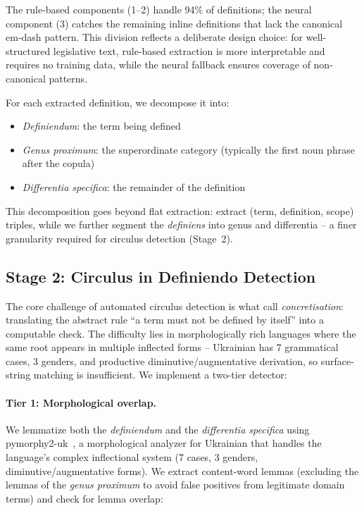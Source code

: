 \documentclass[11pt]{article}
\begin{document}
The rule-based components (1--2) handle 94\% of definitions; the neural component (3) catches the remaining inline definitions that lack the canonical em-dash pattern.
This division reflects a deliberate design choice: for well-structured legislative text, rule-based extraction is more interpretable and requires no training data, while the neural fallback ensures coverage of non-canonical patterns.

For each extracted definition, we decompose it into:
\begin{itemize}[nosep,leftmargin=*]
  \item \emph{Definiendum}: the term being defined
  \item \emph{Genus proximum}: the superordinate category (typically the first noun phrase after the copula)
  \item \emph{Differentia specifica}: the remainder of the definition
\end{itemize}

This decomposition goes beyond flat extraction: \citet{hosabettu2025statutory} extract (term, definition, scope) triples, while we further segment the \emph{definiens} into genus and differentia -- a finer granularity required for circulus detection (Stage~2).

\subsection{Stage 2: Circulus in Definiendo Detection}
\label{sec:circulus-method}

The core challenge of automated circulus detection is what \citet{hofler2012style} call \emph{concretisation}: translating the abstract rule ``a term must not be defined by itself'' into a computable check.
The difficulty lies in morphologically rich languages where the same root appears in multiple inflected forms -- Ukrainian has 7 grammatical cases, 3 genders, and productive diminutive/augmentative derivation, so surface-string matching is insufficient.
We implement a two-tier detector:

\paragraph{Tier 1: Morphological overlap.}
We lemmatize both the \emph{definiendum} and the \emph{differentia specifica} using pymorphy2-uk~\citep{korobov2015morphological}, a morphological analyzer for Ukrainian that handles the language's complex inflectional system (7 cases, 3 genders, diminutive/augmentative forms).
We extract content-word lemmas (excluding the lemmas of the \emph{genus proximum} to avoid false positives from legitimate domain terms) and check for lemma overlap:
\end{document}
